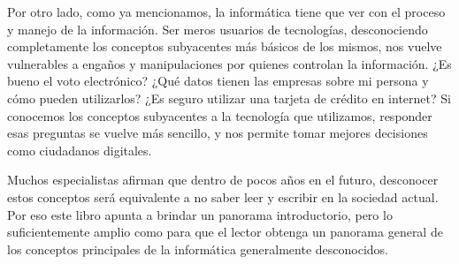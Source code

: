 Por otro lado, como ya mencionamos, la informática tiene que ver con el proceso
y manejo de la información. Ser meros usuarios de tecnologías, desconociendo
completamente los conceptos subyacentes más básicos de los mismos, nos vuelve
vulnerables a engaños y manipulaciones por quienes controlan la información. ¿Es
bueno el voto electrónico? ¿Qué datos tienen las empresas sobre mi persona y
cómo pueden utilizarlos? ¿Es seguro utilizar una tarjeta de crédito en internet?
Si conocemos los conceptos subyacentes a la tecnología que utilizamos, responder
esas preguntas se vuelve más sencillo, y nos permite tomar mejores decisiones
como ciudadanos digitales.

Muchos especialistas afirman que dentro de pocos años en el futuro, desconocer
estos conceptos será equivalente a no saber leer y escribir en la sociedad
actual. Por eso este libro apunta a brindar un panorama introductorio, pero lo
suficientemente amplio como para que el lector obtenga un panorama general de
los conceptos principales de la informática generalmente desconocidos.
